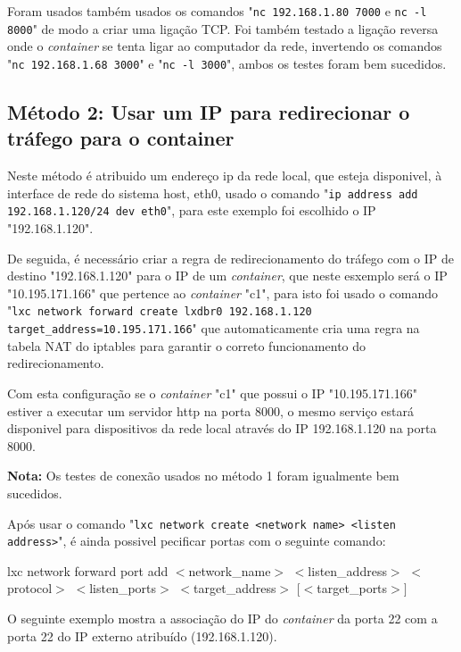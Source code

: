 Foram usados também usados os comandos "\texttt{nc 192.168.1.80 7000} e \texttt{nc -l 8000}"
de modo a criar uma ligação TCP. Foi também testado a ligação reversa
onde o \textit{container} se tenta ligar ao computador da rede, invertendo os comandos
"\texttt{nc 192.168.1.68 3000}" e "\texttt{nc -l 3000}", ambos os testes foram bem
sucedidos.







\subsection{Método 2: Usar um IP para redirecionar o tráfego para o container}

Neste método é atribuido um endereço ip da rede local, que esteja disponivel, à
interface de rede do sistema host, eth0, usado o comando
"\texttt{ip address add 192.168.1.120/24 dev eth0}", para este exemplo foi escolhido o IP
"192.168.1.120".

De seguida, é necessário criar a regra de redirecionamento do tráfego
com o IP de destino "192.168.1.120" para o IP de um \textit{container}, que neste esxemplo será o
IP "10.195.171.166" que pertence ao \textit{container} "c1", para isto foi usado o
comando "\texttt{lxc network forward create lxdbr0 192.168.1.120 target\_address=10.195.171.166}"
que automaticamente cria uma regra na tabela NAT do iptables para garantir o correto
funcionamento do redirecionamento.

Com esta configuração se o \textit{container} "c1" que possui o IP "10.195.171.166" estiver a executar um servidor 
http na porta 8000, o mesmo serviço estará disponivel para dispositivos da rede local
através do IP 192.168.1.120 na porta 8000.

\textbf{Nota:} Os testes de conexão usados no método 1 foram igualmente bem sucedidos.


Após usar o comando "\texttt{lxc network create <network name> <listen address>}", é ainda possivel pecificar portas com o seguinte comando:

\begin{tcolorbox}[colback=blue!5!white,colframe=blue!75!black]
    lxc network forward port add $<$network\_name$>$ $<$listen\_address$>$ $<$protocol$>$ $<$listen\_ports$>$ $<$target\_address$>$ $[<$target\_ports$>]$
\end{tcolorbox}

O seguinte exemplo mostra a associação do IP do \textit{container} da porta 22 com a porta 22 do IP externo atribuído (192.168.1.120).


